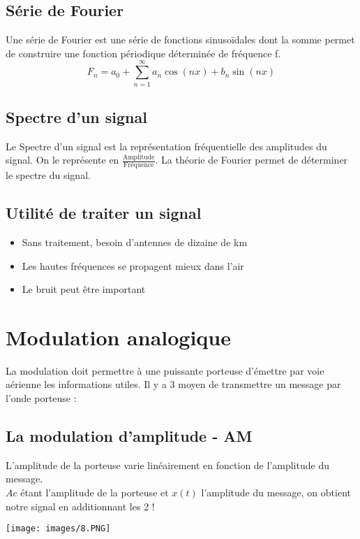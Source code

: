 \documentclass[a4paper]{article}
\begin{document}
\subsection{Série de Fourier}

Une série de Fourier est une série de fonctions sinusoïdales dont la somme permet de construire une fonction périodique déterminée de fréquence f.
\[ F_n = a_0 + \sum_{n = 1}^{\infty} a_n \cos(n x) + b_n \sin(n x) \]


\subsection{Spectre d'un signal}
Le Spectre d’un signal est la représentation fréquentielle des amplitudes du signal. On le représente en    
$ \frac{\text{Amplitude}}{\text{Fréquence}} $.
La théorie de Fourier permet de déterminer le spectre du signal.

\subsection{Utilité de traiter un signal}
\begin{itemize}
    \item Sans traitement, besoin d'antennes de dizaine de km
    \item Les hautes fréquences se propagent mieux dans l'air
    \item Le bruit peut être important
\end{itemize}

\section{Modulation analogique}
La modulation doit permettre à une puissante porteuse d’émettre
par voie aérienne les informations utiles.
Il y a 3 moyen de transmettre un message par l'onde porteuse :
\subsection{La modulation d'amplitude - AM}
L'amplitude de la porteuse varie linéairement en fonction de l'amplitude du message.\\
$Ac$ étant l'amplitude de la porteuse et $x(t)$ l'amplitude du message, on obtient notre signal en additionnant les 2 !
\begin{center}
    \texttt{[image: images/8.PNG]}
\end{center}
\end{document}
